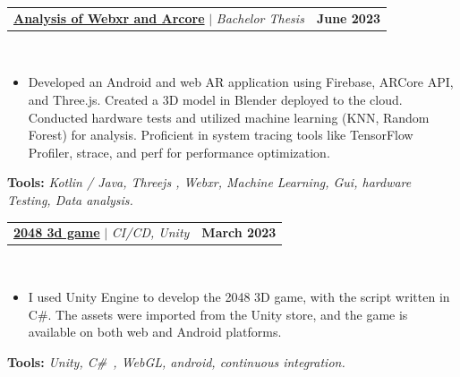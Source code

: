 \documentclass[letterpaper,11pt]{article}
\makeatletter
\newcommand{\resumeItem}[1]{
  \item\small{
    {#1 \vspace{-2pt}}
  }
}
\newcommand{\resumeProjectHeading}[2]{
    \item
    \begin{tabular*}{1.001\textwidth}{l@{\extracolsep{\fill}}r}
      \small#1 & \textbf{\small #2}\\
    \end{tabular*}\vspace{-7pt}
}
\newcommand{\resumeItemListStart}{\begin{itemize}}
\newcommand{\resumeItemListEnd}{\end{itemize}\vspace{-5pt}}
\makeatother
\begin{document}
            

                

 \resumeProjectHeading
          {\textbf{\href{https://www.yakkshit.com/#project-1}{Analysis of Webxr and Arcore}} $|$ \emph{Bachelor Thesis \faGithub}}{June 2023}\\
          \vspace{9pt}
          \vspace{-8pt}
          \resumeItemListStart
            \resumeItem{Developed an Android and web AR application using Firebase, ARCore API, and Three.js. Created a 3D model in Blender deployed to the cloud. Conducted hardware tests and utilized machine learning (KNN, Random Forest) for analysis. Proficient in system tracing tools like TensorFlow Profiler, strace, and perf for performance optimization.}
          \resumeItemListEnd 
          \textbf{Tools:}\emph{
                                Kotlin / Java, Threejs , Webxr, Machine Learning, Gui, hardware Testing, Data analysis.}

 
                

 \resumeProjectHeading
          {\textbf{\href{https://github.com/yakkshit/2048-3d-master.git}{2048 3d game}} $|$ \emph{CI/CD, Unity \faGithub}}{March 2023}\\
          \vspace{9pt}
          \vspace{-8pt}
          \resumeItemListStart
            \resumeItem{I used Unity Engine to develop the 2048 3D game, with the script written in C#. The assets were imported from the Unity store, and the game is available on both web and Android platforms.}
          \resumeItemListEnd 
          \textbf{Tools:}\emph{
                                Unity, C\#\ , WebGL, android, continuous integration.}
\end{document}
